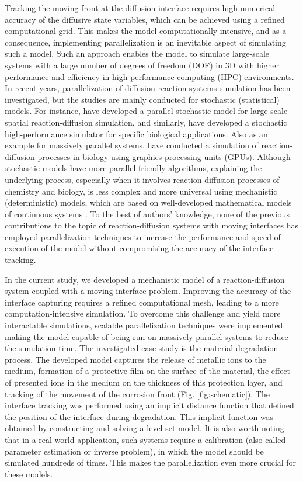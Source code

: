 Tracking the moving front at the diffusion interface requires high numerical accuracy of the diffusive state variables, which can be achieved using a refined computational grid. This makes the model computationally intensive, and as a consequence, implementing parallelization is an inevitable aspect of simulating such a model.  Such an approach enables the model to simulate large-scale systems with a large number of degrees of freedom ({DOF}) in 3D with higher performance and efficiency in high-performance computing ({HPC}) environments. In recent years, parallelization of diffusion-reaction systems simulation has been investigated, but the studies are mainly conducted for stochastic (statistical) models. For instance, \cite{Chen2017} have developed a parallel stochastic model for large-scale spatial reaction-diffusion simulation, and similarly, \cite{Arjunan2020} have developed a stochastic high-performance simulator for specific biological applications. Also as an example for massively parallel systems, \cite{Hallock2014} have conducted a simulation of reaction-diffusion processes in biology using graphics processing units ({GPU}s). Although stochastic models have more parallel-friendly algorithms, explaining the underlying process, especially when it involves reaction-diffusion processes of chemistry and biology, is less complex and more universal using mechanistic (deterministic) models, which are based on well-developed mathematical models of continuous systems \cite{Kendall1999}. To the best of authors' knowledge, none of the previous contributions to the topic of reaction-diffusion systems with moving interfaces has employed parallelization techniques to increase the performance and speed of execution of the model without compromising the accuracy of the interface tracking.

In the current study, we developed a mechanistic model of a reaction-diffusion system coupled with a moving interface problem. Improving the accuracy of the interface capturing requires a refined computational mesh, leading to a more computation-intensive simulation. To overcome this challenge and yield more interactable simulations, scalable  parallelization techniques were implemented making the model capable of being run on massively parallel systems to reduce the simulation time. The investigated case-study is the
material degradation process. The developed model captures the release of metallic ions to the medium, formation of a protective film on the surface of the material, the effect of presented ions in the medium on the thickness of this protection layer, and tracking of the movement of the corrosion front (Fig. \ref{fig:schematic}). The interface tracking was performed using an implicit distance function that defined the position of the interface during degradation. This implicit function was obtained by constructing and solving a level set model. It is also worth noting that in a real-world application, such systems require a calibration (also called parameter estimation or inverse problem), in which the model should be simulated hundreds of times. This makes the parallelization even more crucial for these models.



